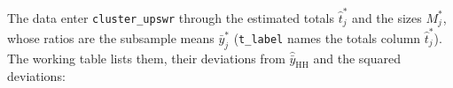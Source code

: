 \documentclass[
  letterpaper,
  DIV=11,
  numbers=noendperiod]{scrreprt}
\newenvironment{Shaded}{\begin{snugshade}}{\end{snugshade}}
\newcommand{\AttributeTok}[1]{\textcolor[rgb]{0.40,0.45,0.13}{#1}}
\newcommand{\FunctionTok}[1]{\textcolor[rgb]{0.28,0.35,0.67}{#1}}
\newcommand{\NormalTok}[1]{\textcolor[rgb]{0.00,0.23,0.31}{#1}}
\newcommand{\OtherTok}[1]{\textcolor[rgb]{0.00,0.23,0.31}{#1}}
\newcommand{\SpecialCharTok}[1]{\textcolor[rgb]{0.37,0.37,0.37}{#1}}
\newcommand{\StringTok}[1]{\textcolor[rgb]{0.13,0.47,0.30}{#1}}
\renewcommand{\[}{\begin{equation}}
\renewcommand{\]}{\end{equation}}
\begin{document}
The data enter \texttt{cluster\_upswr} through the estimated totals
\(\hat{t}_j^*\) and the sizes \(M_j^*\), whose ratios are the subsample
means \(\bar{y}_j^*\) (\texttt{t\_label} names the totals column
\(\hat{t}_j^*\)). The working table lists them, their deviations from
\(\hat{\bar{y}}_{\mathrm{HH}}\) and the squared deviations:

\begin{Shaded}
\end{Shaded}
\end{document}
